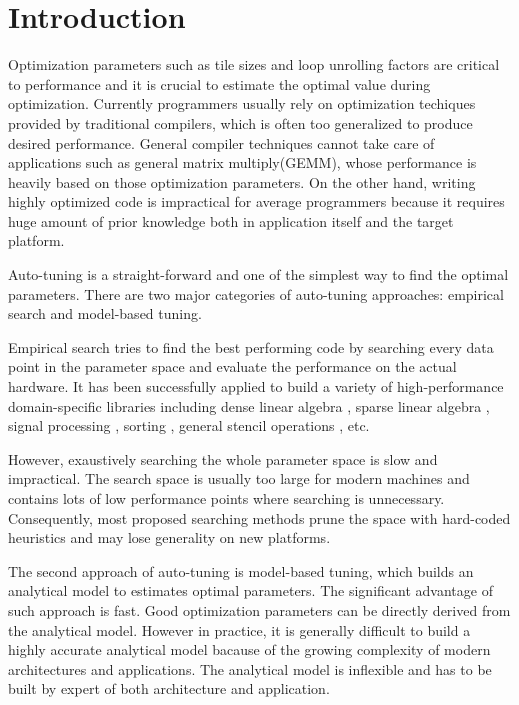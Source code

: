 \section{Introduction}
\label{sec:intro}


Optimization parameters such as tile sizes and loop unrolling factors are critical to performance and it
is crucial to estimate the optimal value during optimization.
Currently programmers usually rely on optimization techiques provided by traditional compilers, which
is often too generalized to produce desired performance.
General compiler techniques cannot take care of applications such as general matrix multiply(GEMM),
whose performance is heavily based on those optimization parameters.
On the other hand, writing highly optimized code is impractical for average
programmers because it requires huge amount of prior knowledge both in application
itself and the target platform.


\par

Auto-tuning is a straight-forward and one of the simplest way to find the optimal parameters.
There are two major categories of auto-tuning approaches: empirical search and model-based tuning.
\par
Empirical search tries to find the best performing code by searching every data point in
the parameter space and evaluate the performance on the actual hardware.
It has been successfully applied to build a variety
of high-performance domain-specific libraries including
dense linear algebra \cite{whaley2001automated}\cite{bilmes2014optimizing}, 
sparse linear algebra \cite{vuduc2005oski}, signal processing
\cite{frigo2005design}\cite{puschel2005spiral}, sorting \cite{li2004dynamically},
general stencil operations \cite{kamil2010auto}, etc.
\par
However, exaustively searching the whole parameter space is slow and impractical.
The search space is usually too large for modern machines and contains lots of low performance points where
searching is unnecessary. Consequently, most proposed searching methods
prune the space with hard-coded heuristics and may lose generality on new platforms.

\par
The second approach of auto-tuning is model-based tuning, which builds an analytical model
to estimates optimal parameters. The significant advantage of such approach is fast. Good optimization
parameters can be directly derived from the analytical model.
However in practice, it is generally difficult to build a highly accurate analytical model bacause of the growing complexity
of modern architectures and applications. The analytical model is inflexible and has to be built by expert of both architecture
and application.

